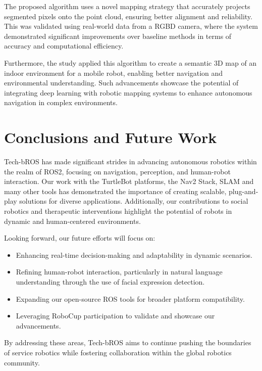 \documentclass[runningheads,a4paper]{llncs}
\begin{document}
The proposed algorithm uses a novel mapping strategy that accurately projects segmented pixels onto the point cloud, ensuring better alignment and reliability. This was validated using real-world data from a RGBD camera, where the system demonstrated significant improvements over baseline methods in terms of accuracy and computational efficiency.

Furthermore, the study applied this algorithm to create a semantic 3D map of an indoor environment for a mobile robot, enabling better navigation and environmental understanding. Such advancements showcase the potential of integrating deep learning with robotic mapping systems to enhance autonomous navigation in complex environments.

\section{Conclusions and Future Work}

Tech-bROS has made significant strides in advancing autonomous robotics within the realm of ROS2, focusing on navigation, perception, and human-robot interaction. Our work with the TurtleBot platforms, the Nav2 Stack, SLAM and many other tools has demonstrated the importance of creating scalable, plug-and-play solutions for diverse applications. Additionally, our contributions to social robotics and therapeutic interventions highlight the potential of robots in dynamic and human-centered environments.

Looking forward, our future efforts will focus on:
\begin{itemize}
    \item Enhancing real-time decision-making and adaptability in dynamic scenarios.
    \item Refining human-robot interaction, particularly in natural language understanding through the use of facial expression detection.
    \item Expanding our open-source ROS tools for broader platform compatibility.
    \item Leveraging RoboCup participation to validate and showcase our advancements.
\end{itemize}

By addressing these areas, Tech-bROS aims to continue pushing the boundaries of service robotics while fostering collaboration within the global robotics community.

%
%






\clearpage{}

%
%

\robospecs{}




\nocite{*}
\end{document}
